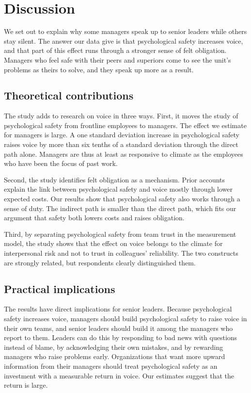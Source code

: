 \documentclass[12pt]{article}
\begin{document}
\section{Discussion}

We set out to explain why some managers speak up to senior leaders while others stay silent. The answer our data give is that psychological safety increases voice, and that part of this effect runs through a stronger sense of felt obligation. Managers who feel safe with their peers and superiors come to see the unit's problems as theirs to solve, and they speak up more as a result.

\subsection{Theoretical contributions}

The study adds to research on voice in three ways. First, it moves the study of psychological safety from frontline employees to managers. The effect we estimate for managers is large. A one standard deviation increase in psychological safety raises voice by more than six tenths of a standard deviation through the direct path alone. Managers are thus at least as responsive to climate as the employees who have been the focus of past work.

Second, the study identifies felt obligation as a mechanism. Prior accounts explain the link between psychological safety and voice mostly through lower expected costs. Our results show that psychological safety also works through a sense of duty. The indirect path is smaller than the direct path, which fits our argument that safety both lowers costs and raises obligation.

Third, by separating psychological safety from team trust in the measurement model, the study shows that the effect on voice belongs to the climate for interpersonal risk and not to trust in colleagues' reliability. The two constructs are strongly related, but respondents clearly distinguished them.

\subsection{Practical implications}

The results have direct implications for senior leaders. Because psychological safety increases voice, managers should build psychological safety to raise voice in their own teams, and senior leaders should build it among the managers who report to them. Leaders can do this by responding to bad news with questions instead of blame, by acknowledging their own mistakes, and by rewarding managers who raise problems early. Organizations that want more upward information from their managers should treat psychological safety as an investment with a measurable return in voice. Our estimates suggest that the return is large.
\end{document}
